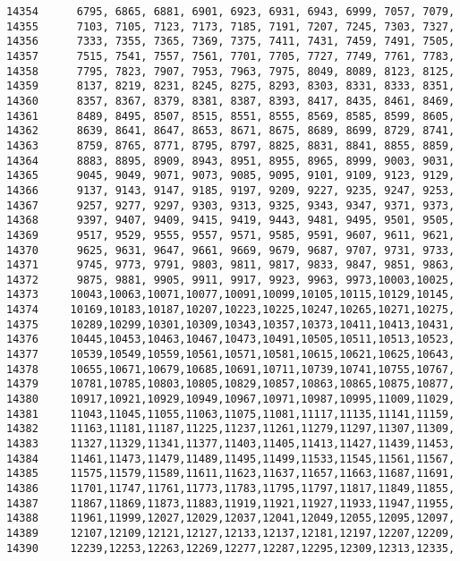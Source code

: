 \begin{Code}
\begin{verbatim}
14354      6795, 6865, 6881, 6901, 6923, 6931, 6943, 6999, 7057, 7079,
14355      7103, 7105, 7123, 7173, 7185, 7191, 7207, 7245, 7303, 7327, 
14356      7333, 7355, 7365, 7369, 7375, 7411, 7431, 7459, 7491, 7505, 
14357      7515, 7541, 7557, 7561, 7701, 7705, 7727, 7749, 7761, 7783,
14358      7795, 7823, 7907, 7953, 7963, 7975, 8049, 8089, 8123, 8125,
14359      8137, 8219, 8231, 8245, 8275, 8293, 8303, 8331, 8333, 8351,
14360      8357, 8367, 8379, 8381, 8387, 8393, 8417, 8435, 8461, 8469,
14361      8489, 8495, 8507, 8515, 8551, 8555, 8569, 8585, 8599, 8605,
14362      8639, 8641, 8647, 8653, 8671, 8675, 8689, 8699, 8729, 8741,
14363      8759, 8765, 8771, 8795, 8797, 8825, 8831, 8841, 8855, 8859,
14364      8883, 8895, 8909, 8943, 8951, 8955, 8965, 8999, 9003, 9031,
14365      9045, 9049, 9071, 9073, 9085, 9095, 9101, 9109, 9123, 9129,
14366      9137, 9143, 9147, 9185, 9197, 9209, 9227, 9235, 9247, 9253,
14367      9257, 9277, 9297, 9303, 9313, 9325, 9343, 9347, 9371, 9373,
14368      9397, 9407, 9409, 9415, 9419, 9443, 9481, 9495, 9501, 9505,
14369      9517, 9529, 9555, 9557, 9571, 9585, 9591, 9607, 9611, 9621,
14370      9625, 9631, 9647, 9661, 9669, 9679, 9687, 9707, 9731, 9733,
14371      9745, 9773, 9791, 9803, 9811, 9817, 9833, 9847, 9851, 9863,
14372      9875, 9881, 9905, 9911, 9917, 9923, 9963, 9973,10003,10025,
14373     10043,10063,10071,10077,10091,10099,10105,10115,10129,10145,
14374     10169,10183,10187,10207,10223,10225,10247,10265,10271,10275,
14375     10289,10299,10301,10309,10343,10357,10373,10411,10413,10431,
14376     10445,10453,10463,10467,10473,10491,10505,10511,10513,10523,
14377     10539,10549,10559,10561,10571,10581,10615,10621,10625,10643,
14378     10655,10671,10679,10685,10691,10711,10739,10741,10755,10767,
14379     10781,10785,10803,10805,10829,10857,10863,10865,10875,10877,
14380     10917,10921,10929,10949,10967,10971,10987,10995,11009,11029,
14381     11043,11045,11055,11063,11075,11081,11117,11135,11141,11159,
14382     11163,11181,11187,11225,11237,11261,11279,11297,11307,11309,
14383     11327,11329,11341,11377,11403,11405,11413,11427,11439,11453,
14384     11461,11473,11479,11489,11495,11499,11533,11545,11561,11567,
14385     11575,11579,11589,11611,11623,11637,11657,11663,11687,11691,
14386     11701,11747,11761,11773,11783,11795,11797,11817,11849,11855,
14387     11867,11869,11873,11883,11919,11921,11927,11933,11947,11955,
14388     11961,11999,12027,12029,12037,12041,12049,12055,12095,12097,
14389     12107,12109,12121,12127,12133,12137,12181,12197,12207,12209,
14390     12239,12253,12263,12269,12277,12287,12295,12309,12313,12335,

\end{verbatim}
\end{Code}
